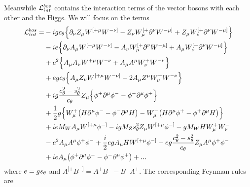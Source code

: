 Meanwhile $\mathcal{L}_{int}^{bos}$ contains the interaction terms of the vector
bosons with each other and the Higgs. We will focus on the terms
\begin{equation}
  \begin{aligned}
    \mathcal{L}_{int}^{bos}=&-igc_{\theta}\Big\{\partial_\nu Z_\mu W^{[+\mu}W^{-\nu ]}
                       -Z_\nu W_\mu^{[+}\partial^\nu W^{-\mu ]}
                       +Z_\mu W_\nu^{[+}\partial^\nu W^{-\mu ]}\Big\}\\
                      &-ie\Big\{\partial_\nu A_\mu W^{[+\mu}W^{-\nu]}
                       -A_\nu W_\mu^{[+}\partial^\nu W^{-\mu ]}
                       +A_\mu W_\nu^{[+}\partial^\nu W^{-\mu ]}\Big\}\\
                      &+e^2 \Big\{A_\mu A_\nu W^{+\mu}W^{-\nu}
                       +A_\mu A^\mu W^+_\nu W^{-\nu}\Big\}\\
                      &+egc_{\theta}\Big\{A_\mu Z_\nu W^{[+\mu}W^{-\nu ]}
                       -2A_\mu Z^\mu W^+_\nu W^{-\nu}\Big\}\\
                      &+ig\frac{c_{\theta}^2-s_{\theta}^2}{c_{\theta}}Z_\mu
                         \Big\{\phi^+ \partial^\mu \phi^-
                               -\phi^- \partial^\mu \phi^+ \Big\}\\
                      &+\frac{1}{2}g
                         \Big\{W_\mu^+\big(H\partial^\mu\phi^- 
                               -\phi^-\partial^\mu H\big)
                              -W_\mu^-\big(H\partial^\mu\phi^+ 
                               -\phi^+\partial^\mu H\big)\Big\}\\
                      &+ieM_W A_\mu W^{[+\mu}\phi^{-]}
                       -igM_Z s_{\theta}^2 Z_\mu W^{[+\mu}\phi^{-]}
                       -gM_W H W_\mu^+ W_\nu^- \\
                      &-e^2 A_\mu A^\mu \phi^+ \phi^-
                       +\frac{i}{2}egA_\mu HW^{[+\mu}\phi^{-]}
                       -eg\frac{c_{\theta}^2-s_{\theta}^2}{c_{\theta}}Z_\mu A^\mu \phi^+ \phi^- \\
                      &+ieA_\mu \big(\phi^+\partial^\mu\phi^-
                                     -\phi^-\partial^\mu\phi^+\big)
                       +...
  \end{aligned}
\end{equation}
where $e=gs_{\theta}$ and $A^{[+}B^{-]}=A^+ B^- -B^- A^+$. The corresponding Feynman
rules are
